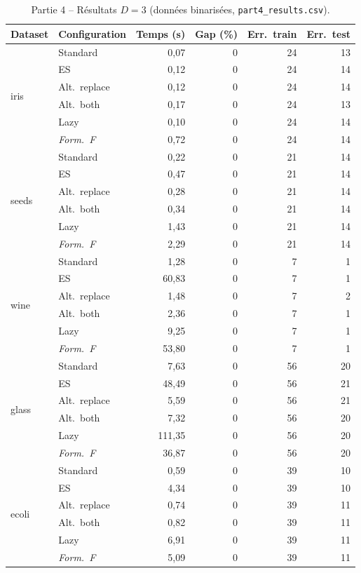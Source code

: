 \documentclass[a4paper,10pt,titlepage,leqno]{article}
\begin{document}
\begin{table}[H]
\centering
\caption{Partie 4 -- Résultats $D=3$ (données binarisées, \texttt{part4\_results.csv}).}
\label{tab:part4d3}
\small
\begin{tabular}{@{}l l r r r r@{}}
\toprule
Dataset & Configuration & Temps (s) & Gap (\%) & Err.\ train & Err.\ test \\
\midrule
\multirow{6}{*}{iris}
 & Standard       & 0{,}07 & 0 & 24 & 13 \\
 & ES             & 0{,}12 & 0 & 24 & 14 \\
 & Alt.\ replace  & 0{,}12 & 0 & 24 & 14 \\
 & Alt.\ both     & 0{,}17 & 0 & 24 & 13 \\
 & Lazy           & 0{,}10 & 0 & 24 & 14 \\
 & \textit{Form.\ F} & 0{,}72 & 0 & 24 & 14 \\
\midrule
\multirow{6}{*}{seeds}
 & Standard       & 0{,}22 & 0 & 21 & 14 \\
 & ES             & 0{,}47 & 0 & 21 & 14 \\
 & Alt.\ replace  & 0{,}28 & 0 & 21 & 14 \\
 & Alt.\ both     & 0{,}34 & 0 & 21 & 14 \\
 & Lazy           & 1{,}43 & 0 & 21 & 14 \\
 & \textit{Form.\ F} & 2{,}29 & 0 & 21 & 14 \\
\midrule
\multirow{6}{*}{wine}
 & Standard       & 1{,}28 & 0 & 7 & 1 \\
 & ES             & 60{,}83 & 0 & 7 & 1 \\
 & Alt.\ replace  & 1{,}48 & 0 & 7 & 2 \\
 & Alt.\ both     & 2{,}36 & 0 & 7 & 1 \\
 & Lazy           & 9{,}25 & 0 & 7 & 1 \\
 & \textit{Form.\ F} & 53{,}80 & 0 & 7 & 1 \\
\midrule
\multirow{6}{*}{glass}
 & Standard       & 7{,}63 & 0 & 56 & 20 \\
 & ES             & 48{,}49 & 0 & 56 & 21 \\
 & Alt.\ replace  & 5{,}59 & 0 & 56 & 21 \\
 & Alt.\ both     & 7{,}32 & 0 & 56 & 20 \\
 & Lazy           & 111{,}35 & 0 & 56 & 20 \\
 & \textit{Form.\ F} & 36{,}87 & 0 & 56 & 20 \\
\midrule
\multirow{6}{*}{ecoli}
 & Standard       & 0{,}59 & 0 & 39 & 10 \\
 & ES             & 4{,}34 & 0 & 39 & 10 \\
 & Alt.\ replace  & 0{,}74 & 0 & 39 & 11 \\
 & Alt.\ both     & 0{,}82 & 0 & 39 & 11 \\
 & Lazy           & 6{,}91 & 0 & 39 & 11 \\
 & \textit{Form.\ F} & 5{,}09 & 0 & 39 & 11 \\
\bottomrule
\end{tabular}
\end{table}
\end{document}
